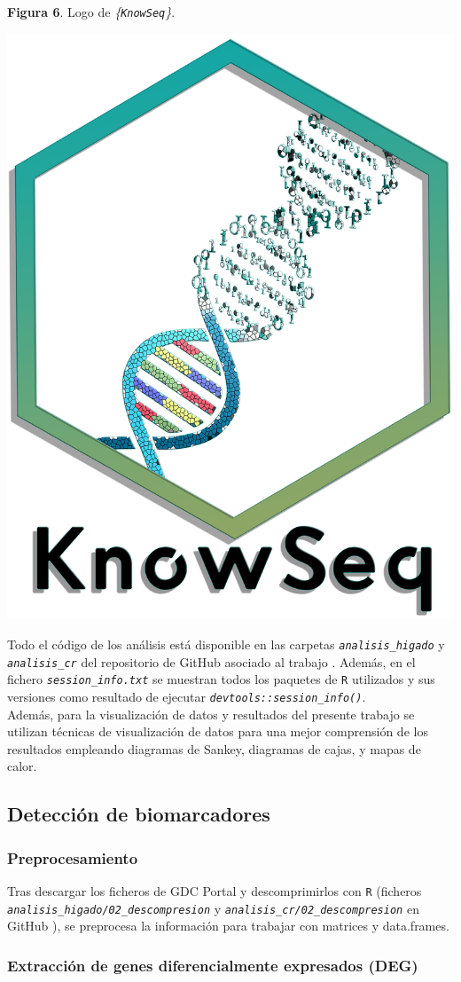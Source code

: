 \begin{center}
\textbf{Figura 6}. Logo de \textit{\{\texttt{KnowSeq}\}}.
\end{center}
\begin{center}
	\includegraphics[width=.3\textwidth]{figuras/06_logo_knowseq.png} 
\end{center}

Todo el código de los análisis está disponible en las carpetas \textit{\texttt{analisis\_higado}} y \textit{\texttt{analisis\_cr}} del repositorio de GitHub asociado al trabajo \cite{Redondo-Sanchez2020}. Además, en el fichero \textit{\texttt{session\_info.txt}} se muestran todos los paquetes de \texttt{R} utilizados y sus versiones como resultado de ejecutar \textit{\texttt{devtools::session\_info()}}.\\

Además, para la visualización de datos y resultados del presente trabajo se utilizan técnicas de visualización de datos para una mejor comprensión de los resultados empleando diagramas de Sankey, diagramas de cajas, y mapas de calor.

\subsection{Detección de biomarcadores}

\subsubsection{Preprocesamiento}

Tras descargar los ficheros de GDC Portal y descomprimirlos con \texttt{R} (ficheros \textit{\texttt{analisis\_higado/02\_descompresion}} y \textit{\texttt{analisis\_cr/02\_descompresion}}  en GitHub \cite{Redondo-Sanchez2020}), se preprocesa la información para trabajar con matrices y data.frames.

\subsubsection{Extracción de genes diferencialmente expresados (DEG)}

